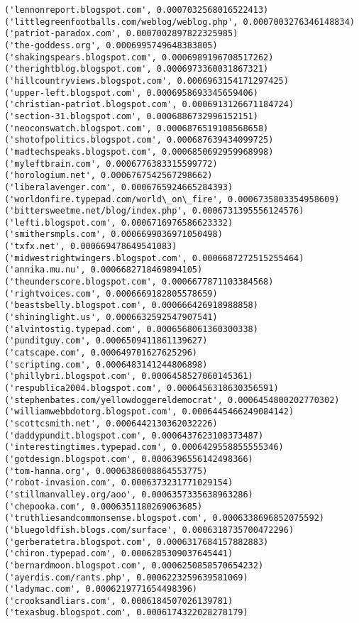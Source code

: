 \documentclass[11pt]{article}
\begin{document}
\begin{Verbatim}[commandchars=\\\{\}]
('lennonreport.blogspot.com', 0.0007032568016522413)
('littlegreenfootballs.com/weblog/weblog.php', 0.0007003276346148834)
('patriot-paradox.com', 0.0007002897822325985)
('the-goddess.org', 0.0006995749648383805)
('shakingspears.blogspot.com', 0.0006989196708517262)
('therightblog.blogspot.com', 0.0006973360031867321)
('hillcountryviews.blogspot.com', 0.0006963154171297425)
('upper-left.blogspot.com', 0.0006958693345659406)
('christian-patriot.blogspot.com', 0.0006913126671184724)
('section-31.blogspot.com', 0.0006886732996152151)
('neoconswatch.blogspot.com', 0.0006876519108568658)
('shotofpolitics.blogspot.com', 0.000687639434099725)
('madtechspeaks.blogspot.com', 0.0006850692959968998)
('myleftbrain.com', 0.0006776383315599772)
('horologium.net', 0.0006767542567298662)
('liberalavenger.com', 0.0006765924665284393)
('worldonfire.typepad.com/world\_on\_fire', 0.0006735803354958609)
('bittersweetme.net/blog/index.php', 0.0006731395556124576)
('lefti.blogspot.com', 0.0006716976586623332)
('smithersmpls.com', 0.0006699036971050498)
('txfx.net', 0.000669478649541083)
('midwestrightwingers.blogspot.com', 0.0006687272515255464)
('annika.mu.nu', 0.0006682718469894105)
('theunderscore.blogspot.com', 0.0006677871103384568)
('rightvoices.com', 0.0006669182805578659)
('beastsbelly.blogspot.com', 0.000666426918988858)
('shininglight.us', 0.0006632592547907541)
('alvintostig.typepad.com', 0.0006568061360300338)
('punditguy.com', 0.0006509411861139627)
('catscape.com', 0.000649701627625296)
('scripting.com', 0.0006483141244806898)
('phillybri.blogspot.com', 0.0006458527060145361)
('respublica2004.blogspot.com', 0.0006456318630356591)
('stephenbates.com/yellowdoggereldemocrat', 0.0006454800202770302)
('williamwebbdotorg.blogspot.com', 0.0006445466249084142)
('scottcsmith.net', 0.0006442130362032226)
('daddypundit.blogspot.com', 0.0006437623108373487)
('interestingtimes.typepad.com', 0.0006429558855555346)
('gotdesign.blogspot.com', 0.0006396556142498366)
('tom-hanna.org', 0.0006386008864553775)
('robot-invasion.com', 0.0006373231771029154)
('stillmanvalley.org/aoo', 0.0006357335638963286)
('chepooka.com', 0.0006351180269063685)
('truthliesandcommonsense.blogspot.com', 0.0006338696852075592)
('bluegoldfish.blogs.com/surface', 0.0006318735700472296)
('gerberatetra.blogspot.com', 0.0006317684157882883)
('chiron.typepad.com', 0.0006285309037645441)
('bernardmoon.blogspot.com', 0.0006250858570654232)
('ayerdis.com/rants.php', 0.0006223259639581069)
('ladymac.com', 0.0006219771654498396)
('crooksandliars.com', 0.0006184507026139781)
('texasbug.blogspot.com', 0.0006174322028278179)

\end{Verbatim}
\end{document}
